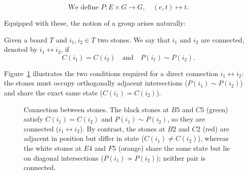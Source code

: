 \begin{definition}
	\label{funcionposiciion}$$\text{We define } P: E \times G \to G, \quad (e,t) \mapsto t.$$
	\end{definition}
	
Equipped with these, the notion of a group arises naturally:

\begin{definition}[Connection]
	Given a board $T$ and $i_1, i_2 \in T$ two stones. We say that $i_1$ and $i_2$ are connected, denoted by $i_1 \leftrightarrow i_2$, if
	$$C(i_1) = C(i_2) \quad \text{and} \quad P(i_1) \sim P(i_2).$$
\end{definition}

Figure~\ref{fig:def_connection} illustrates the two conditions required for a direct connection $i_1 \leftrightarrow i_2$: the stones must occupy orthogonally adjacent intersections ($P(i_1) \sim P(i_2)$) and share the exact same state ($C(i_1) = C(i_2)$).

\begin{figure}[H]
	\centering
	\begin{goban}[7, hoshi = false,label = {at = {south, west}}]
	\end{goban}
	\caption{Connection between stones. The black stones at $B5$ and $C5$ (\textcolor{Moss}{green}) satisfy $C(i_1) = C(i_2)$ and $P(i_1) \sim P(i_2)$, so they are connected ($i_1 \leftrightarrow i_2$). By contrast, the stones at $B2$ and $C2$ (\textcolor{sealred}{red}) are adjacent in position but differ in state ($C(i_1) \neq C(i_2)$), whereas the white stones at $E4$ and $F5$ (\textcolor{terracotta}{orange})
		share the same state but lie on diagonal intersections ($P(i_1) \not\sim P(i_2)$);
		neither pair is connected.}
	\label{fig:def_connection}
	\end{figure}

